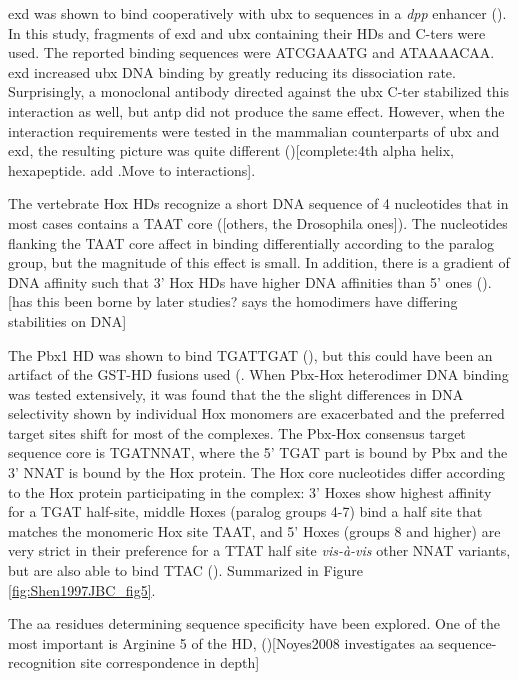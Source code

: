 \ac{exd} was shown to bind cooperatively with \ac{ubx} to sequences in a \textit{dpp} enhancer (\cite{Chan1994}). In this study, fragments of \ac{exd} and \ac{ubx} containing their \acp{HD} and \acp{C-ter} were used. The reported binding sequences were ATCGAAATG and ATAAAACAA. \ac{exd} increased \ac{ubx} DNA binding by greatly reducing its dissociation rate. Surprisingly, a monoclonal antibody directed against the \ac{ubx} \ac{C-ter} stabilized this interaction as well, but \ac{antp} did not produce the same effect. However, when the interaction requirements were tested in the mammalian counterparts of \ac{ubx} and \ac{exd}, the resulting picture was quite different (\cite{Chang1995})[complete:4th alpha helix, hexapeptide. add \cite{Lu1996}.Move to interactions].

The vertebrate Hox \acp{HD} recognize a short DNA sequence of 4 nucleotides that in most cases contains a TAAT core (\cite{Treisman1992,Catron1993}[others, the Drosophila ones]). The nucleotides flanking the TAAT core affect in binding differentially according to the paralog group, but the magnitude of this effect is small. In addition, there is a gradient of DNA affinity such that 3' Hox \acp{HD} have higher DNA affinities than 5' ones (\cite{Pellerin1994}). [has this been borne by later studies? \cite{Shen1997a} says the homodimers have differing stabilities on DNA]

The Pbx1 \ac{HD} was shown to bind TGATTGAT (\cite{VanDijk1993}), but this could have been an artifact of the GST-\ac{HD} fusions used (\cite{review que lo decia: Mann and chan 1996?}. When Pbx-Hox heterodimer DNA binding was tested extensively, it was found that the the slight differences in DNA selectivity shown by individual Hox monomers are exacerbated and the preferred target sites shift for most of the complexes. The Pbx-Hox consensus target sequence core is TGATNNAT, where the 5' TGAT part is bound by Pbx and the 3' NNAT is bound by the Hox protein. The Hox core nucleotides differ according to the Hox protein participating in the complex: 3' Hoxes show highest affinity for a TGAT half-site, middle Hoxes (paralog groups 4-7) bind a half site that matches the monomeric Hox site TAAT, and 5' Hoxes (groups 8 and higher) are very strict in their preference for a TTAT half site \textit{vis-à-vis} other NNAT variants, but are also able to bind TTAC (\cite{Chang1996,Chan1997,Shen1997a}). Summarized in Figure \ref{fig:Shen1997JBC_fig5}.

The \ac{aa} residues determining sequence specificity have been explored. One of the most important is Arginine 5 of the \ac{HD}, (\cite{Phelan1997})[Noyes2008 investigates aa sequence-recognition site correspondence in depth] 


